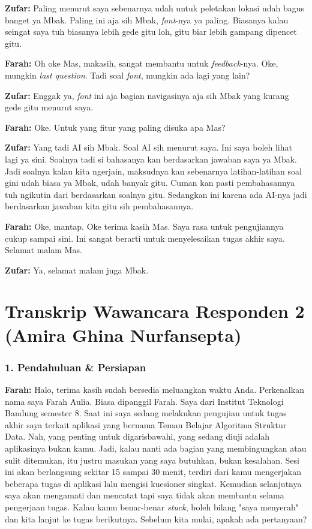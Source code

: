 \textbf{Zufar:} Paling menurut saya sebenarnya udah untuk peletakan lokasi udah bagus banget ya Mbak. Paling ini aja sih Mbak, \textit{font}-nya ya paling. Biasanya kalau seingat saya tuh biasanya lebih gede gitu loh, gitu biar lebih gampang dipencet gitu.

\textbf{Farah:} Oh oke Mas, makasih, sangat membantu untuk \textit{feedback}-nya. Oke, mungkin \textit{last question}. Tadi soal \textit{font}, mungkin ada lagi yang lain?

\textbf{Zufar:} Enggak ya, \textit{font} ini aja bagian navigasinya aja sih Mbak yang kurang gede gitu menurut saya.

\textbf{Farah:} Oke. Untuk yang fitur yang paling disuka apa Mas?

\textbf{Zufar:} Yang tadi AI sih Mbak. Soal AI sih menurut saya. Ini saya boleh lihat lagi ya sini. Soalnya tadi si bahasanya kan berdasarkan jawaban saya ya Mbak. Jadi soalnya kalau kita ngerjain, maksudnya kan sebenarnya latihan-latihan soal gini udah biasa ya Mbak, udah banyak gitu. Cuman kan pasti pembahasannya tuh ngikutin dari berdasarkan soalnya gitu. Sedangkan ini karena ada AI-nya jadi berdasarkan jawaban kita gitu sih pembahasannya.

\textbf{Farah:} Oke, mantap. Oke terima kasih Mas. Saya rasa untuk pengujiannya cukup sampai sini. Ini sangat berarti untuk menyelesaikan tugas akhir saya. Selamat malam Mas.

\textbf{Zufar:} Ya, selamat malam juga Mbak.

\section{Transkrip Wawancara Responden 2 (Amira Ghina Nurfansepta)}

\subsubsection*{1. Pendahuluan \& Persiapan}

\textbf{Farah:} Halo, terima kasih sudah bersedia meluangkan waktu Anda. Perkenalkan nama saya Farah Aulia. Biasa dipanggil Farah. Saya dari Institut Teknologi Bandung semester 8. Saat ini saya sedang melakukan pengujian untuk tugas akhir saya terkait aplikasi yang bernama Teman Belajar Algoritma Struktur Data. Nah, yang penting untuk digarisbawahi, yang sedang diuji adalah aplikasinya bukan kamu. Jadi, kalau nanti ada bagian yang membingungkan atau sulit ditemukan, itu justru masukan yang saya butuhkan, bukan kesalahan. Sesi ini akan berlangsung sekitar 15 sampai 30 menit, terdiri dari kamu mengerjakan beberapa tugas di aplikasi lalu mengisi kuesioner singkat. Kemudian selanjutnya saya akan mengamati dan mencatat tapi saya tidak akan membantu selama pengerjaan tugas. Kalau kamu benar-benar \textit{stuck}, boleh bilang "saya menyerah" dan kita lanjut ke tugas berikutnya. Sebelum kita mulai, apakah ada pertanyaan?

